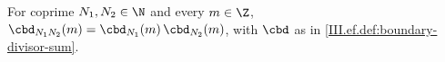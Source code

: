 For coprime $N_1,N_2\in\N$ and every $m\in\Z$, $\cbd_{N_1N_2}(m)=\cbd_{N_1}(m)\,\cbd_{N_2}(m)$, with $\cbd$ as in
\cref{III.ef.def:boundary-divisor-sum}.
